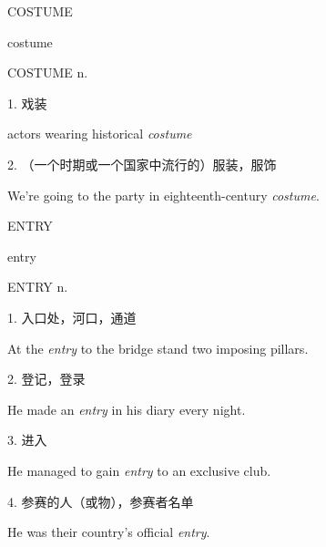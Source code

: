 \begin{flashcard}{
COSTUME

costume
}
\begin{center}
COSTUME n. 
\end{center}
1. 戏装

actors wearing historical \textit{costume}

2. （一个时期或一个国家中流行的）服装，服饰

We're going to the party in eighteenth-century \textit{costume}.

\end{flashcard}
\begin{flashcard}{
ENTRY

entry
}
\begin{center}
ENTRY n. 
\end{center}
1. 入口处，河口，通道

At the \textit{entry} to the bridge stand two imposing pillars.

2. 登记，登录

He made an \textit{entry} in his diary every night.

3. 进入

He managed to gain \textit{entry} to an exclusive club.

4. 参赛的人（或物），参赛者名单

He was their country's official \textit{entry}.

\end{flashcard}
